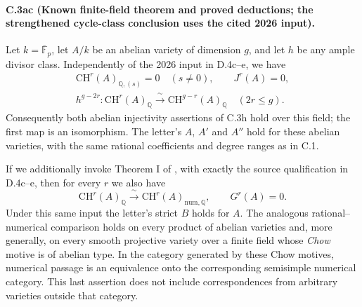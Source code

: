 \paragraph{C.3ac (Known finite-field theorem and proved deductions; the strengthened cycle-class conclusion uses the cited 2026 input).}
Let $k=\overline{\mathbb F}_p$, let $A/k$ be an abelian variety of
dimension $g$, and let $h$ be any ample divisor class. Independently
of the 2026 input in D.4c--e, we have
\begin{equation}\label{eq:C3ac-classical}
 \begin{gathered}
 \mathrm{CH}^r(A)_{\mathbb Q,(s)}=0\quad(s\ne0),\qquad
 J^r(A)=0,\\
 h^{g-2r}:\mathrm{CH}^r(A)_{\mathbb Q}
                 \xrightarrow{\ \sim\ }
                 \mathrm{CH}^{g-r}(A)_{\mathbb Q}
                 \quad(2r\le g).
 \end{gathered}
\end{equation}
Consequently both abelian injectivity assertions of C.3h hold
over this field; the first map is an isomorphism. The letter's
$A$, $A'$ and $A''$ hold for these abelian varieties, with the
same rational coefficients and degree ranges as in C.1.

If we additionally invoke Theorem I of
\citet{D_VanHoftenSempliner2026}, with exactly the source qualification
in D.4c--e, then for every $r$ we also have
\begin{equation}\label{eq:C3ac-stronger}
 \mathrm{CH}^r(A)_{\mathbb Q}
       \xrightarrow{\ \sim\ }
       \mathrm{CH}^r(A)_{\mathrm{num},\mathbb Q},
 \qquad G^r(A)=0.
\end{equation}
Under this same input the letter's strict $B$ holds for $A$.
The analogous rational--numerical comparison holds on every
product of abelian varieties and, more generally, on every
smooth projective variety over a finite field whose \emph{Chow}
motive is of abelian type. In the category generated by these
Chow motives, numerical passage is an equivalence onto the
corresponding semisimple numerical category. This last assertion
does not include correspondences from arbitrary varieties
outside that category.

